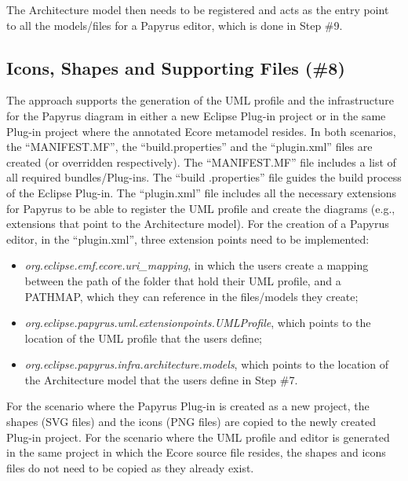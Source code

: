 The Architecture model then needs to be registered and acts as the entry point to all the models/files for a Papyrus editor, which is done in Step \#9.

\subsection{Icons, Shapes and Supporting Files (\#8)}
\label{sec:supportingFiles}
The approach supports the generation of the UML profile and the infrastructure for the Papyrus diagram in either a new Eclipse Plug-in project or in the same Plug-in project where the annotated Ecore metamodel resides. 
In both scenarios, the ``MANIFEST.MF'', the ``build.properties'' and the ``plugin.xml'' files are created (or overridden respectively). 
The ``MANIFEST.MF'' file includes a list of all required bundles/Plug-ins.
The ``build .properties'' file guides the build process of the Eclipse Plug-in.
The ``plugin.xml'' file includes all the necessary extensions for Papyrus to be able to register the UML profile and create the diagrams (e.g., extensions that point to the Architecture model). 
For the creation of a Papyrus editor, in the ``plugin.xml'', three extension points need to be implemented:
\begin{itemize}
	\item \textit{org.eclipse.emf.ecore.uri\_mapping}, in which the users create a mapping between the path of the folder that hold their UML profile, and a PATHMAP, which they can reference in the files/models they create;
	\item \textit{org.eclipse.papyrus.uml.extensionpoints.UMLProfile}, which points to the location of the UML profile that the users define;
	\item \textit{org.eclipse.papyrus.infra.architecture.models}, which points to the location of the Architecture model that the users define in Step \#7.
\end{itemize}

For the scenario where the Papyrus Plug-in is created as a new project, the shapes (SVG files) and the icons (PNG files) are copied to the newly created Plug-in project. 
For the scenario where the UML profile and editor is generated in the same project in which the Ecore source file resides, the shapes and icons files do not need to be copied as they already exist.


